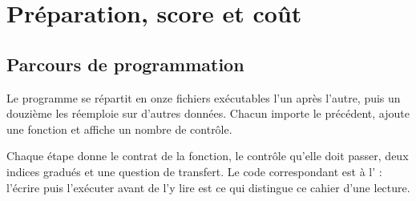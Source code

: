 \chapter{Préparation, score et coût}
\label{ch:donnees}


\section{Parcours de programmation}

Le programme se répartit en onze fichiers exécutables l'un après l'autre, puis
un douzième les réemploie sur d'autres données. Chacun importe le précédent,
ajoute une fonction et affiche un nombre de contrôle.

Chaque étape donne le contrat de la fonction, le contrôle qu'elle doit passer,
deux indices gradués et une question de transfert. Le code correspondant est à
l' : l'écrire puis l'exécuter avant de l'y lire est ce
qui distingue ce cahier d'une lecture.

